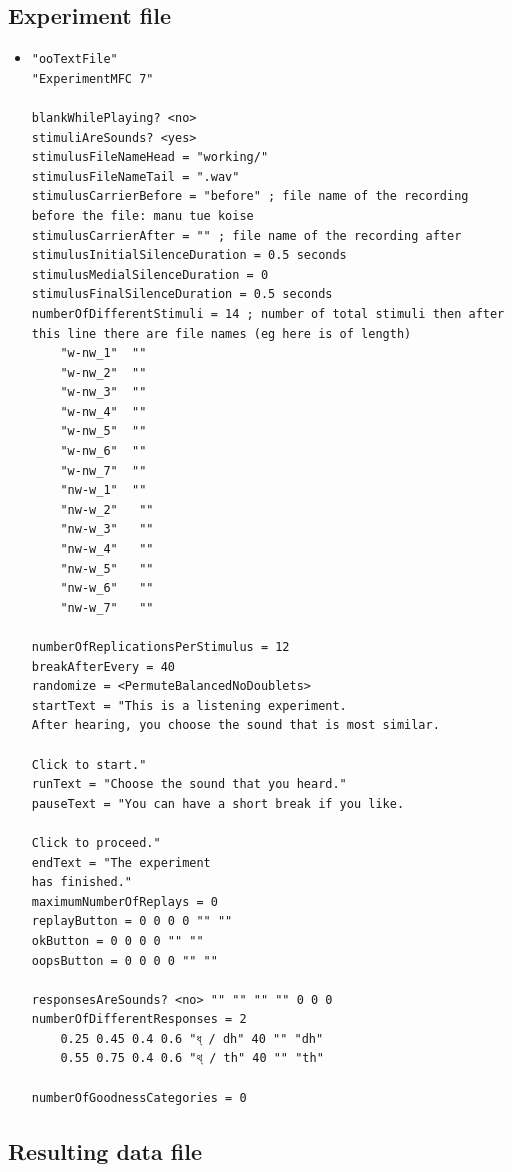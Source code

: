 \documentclass[12pt, english]{article}
\begin{document}
\subsection{Experiment file}
\begin{itemize}
    \item 
    \begin{lstlisting}[xleftmargin=0pt]
"ooTextFile"
"ExperimentMFC 7"

blankWhilePlaying? <no>
stimuliAreSounds? <yes>
stimulusFileNameHead = "working/"
stimulusFileNameTail = ".wav"
stimulusCarrierBefore = "before" ; file name of the recording before the file: manu tue koise
stimulusCarrierAfter = "" ; file name of the recording after
stimulusInitialSilenceDuration = 0.5 seconds
stimulusMedialSilenceDuration = 0
stimulusFinalSilenceDuration = 0.5 seconds
numberOfDifferentStimuli = 14 ; number of total stimuli then after this line there are file names (eg here is of length)
    "w-nw_1"  ""
    "w-nw_2"  ""
    "w-nw_3"  ""
    "w-nw_4"  ""
    "w-nw_5"  ""
    "w-nw_6"  ""
    "w-nw_7"  ""
    "nw-w_1"  ""
    "nw-w_2"   ""
    "nw-w_3"   ""
    "nw-w_4"   ""
    "nw-w_5"   ""
    "nw-w_6"   ""
    "nw-w_7"   ""

numberOfReplicationsPerStimulus = 12
breakAfterEvery = 40
randomize = <PermuteBalancedNoDoublets>
startText = "This is a listening experiment.
After hearing, you choose the sound that is most similar.

Click to start."
runText = "Choose the sound that you heard."
pauseText = "You can have a short break if you like.

Click to proceed."
endText = "The experiment
has finished."
maximumNumberOfReplays = 0
replayButton = 0 0 0 0 "" ""
okButton = 0 0 0 0 "" ""
oopsButton = 0 0 0 0 "" ""

responsesAreSounds? <no> "" "" "" "" 0 0 0
numberOfDifferentResponses = 2
    0.25 0.45 0.4 0.6 "ধ্ / dh" 40 "" "dh"
    0.55 0.75 0.4 0.6 "থ্ / th" 40 "" "th"

numberOfGoodnessCategories = 0
    \end{lstlisting}
\end{itemize} \newpage

\subsection{Resulting data file}
\end{document}
